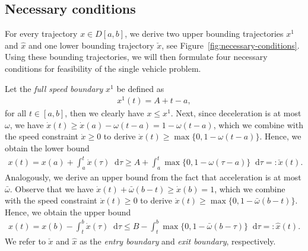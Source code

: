 \documentclass[a4paper]{article}
\theoremstyle{definition}
\theoremstyle{plain}
\newcommand*\diff{\mathop{}\!\mathrm{d}}
\begin{document}
\subsection{Necessary conditions}

For every trajectory $x \in D[a,b]$, we derive two upper
bounding trajectories $x^{1}$ and $\hat{x}$ and one lower bounding trajectory
$\check{x}$, see Figure~\ref{fig:necessary-conditions}.
%
Using these bounding trajectories, we will then formulate four necessary
conditions for feasibility of the single vehicle problem.

Let the \emph{full speed boundary} $x^{1}$ be defined as
\begin{align}
  x^{1}(t) = A + t - a,
\end{align}
for all $t \in [a, b]$, then we clearly have $x \leq x^{1}$.
%
Next, since deceleration is at most $\omega$, we have
$\dot{x}(t) \geq \dot{x}(a) - \omega(t - a) = 1 - \omega(t - a)$, which we
combine with the speed constraint $\dot{x} \geq 0$ to derive
$\dot{x}(t) \geq \max\{0, 1 - \omega (t - a) \}$. Hence, we obtain the lower
bound
\begin{align}\label{eq:check-x}
  x(t) = x(a) + \int_{a}^{t} \dot{x}(\tau) \diff \tau \geq A + \int_{a}^{t} \max\{0, 1 - \omega (\tau - a) \} \diff \tau =: \check{x}(t) .
\end{align}
%
Analogously, we derive an upper bound from the fact that acceleration is at most $\bar{\omega}$. Observe that we have
$\dot{x}(t) + \bar{\omega} (b - t) \geq \dot{x}(b) = 1$, which we combine
with the speed constraint $\dot{x}(t) \geq 0$ to derive
$\dot{x}(t) \geq \max \{ 0, 1 - \bar{\omega}(b - t) \}$. Hence, we obtain the
upper bound
\begin{align}\label{eq:hat-x}
  x(t) = x(b) - \int_{t}^{b} \dot{x}(\tau) \diff \tau
  \leq B - \int_{t}^{b} \max\{ 0, 1 -\bar{\omega} (b - \tau) \} \diff \tau =: \hat{x}(t) .
\end{align}
%
We refer to $\check{x}$ and $\hat{x}$ as the \emph{entry boundary} and
\emph{exit boundary}, respectively.
\end{document}

